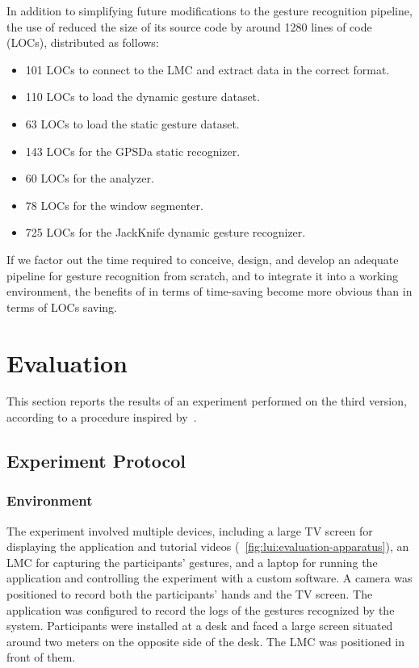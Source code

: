 In addition to simplifying future modifications to the \lui gesture recognition pipeline, the use of \ql reduced the size of its source code by around 1280 lines of code (LOCs), distributed as follows: 
\begin{itemize}[noitemsep]
    \item 101 LOCs to connect to the LMC and extract data in the correct format.
    \item 110 LOCs to load the dynamic gesture dataset.
    \item 63 LOCs to load the static gesture dataset.
    \item 143 LOCs for the GPSDa static recognizer.
    \item 60 LOCs for the analyzer.
    \item 78 LOCs for the window segmenter.
    \item 725 LOCs for the JackKnife dynamic gesture recognizer.
\end{itemize}
If we factor out the time required to conceive, design, and develop an adequate pipeline for gesture recognition from scratch, and to integrate it into a working environment, the benefits of \ql in terms of time-saving become more obvious than in terms of LOCs saving.



\section{Evaluation} \label{sec:lui:evaluation}
This section reports the results of an experiment performed on the third \lui version, according to a procedure inspired by~\cite{Vogiatzidakis:2022}.

\subsection{Experiment Protocol} \label{sec:lui:evaluation:protocol}
\subsubsection{Environment}
The experiment involved multiple devices, including a large TV screen for displaying the \lui application and tutorial videos (\fig~\ref{fig:lui:evaluation-apparatus}), an LMC for capturing the participants' gestures, and a laptop for running the \lui application and controlling the experiment with a custom software. A camera was positioned to record both the participants' hands and the TV screen. The \lui application was configured to record the logs of the gestures recognized by the system.
Participants were installed at a desk and faced a large screen situated around two meters on the opposite side of the desk. The LMC was positioned in front of them.

